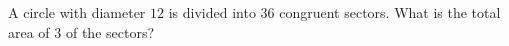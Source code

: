 A circle with diameter $12$ is divided into $36$ congruent sectors. What is the total area of $3$ of the sectors?
